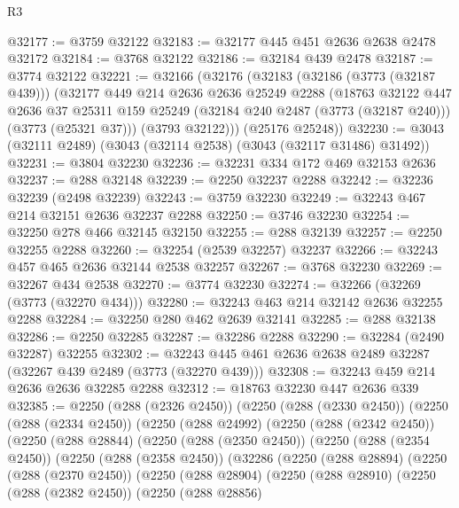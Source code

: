 \begin{lexlean}{R3}
\begin{coremodule}
@32177 := @3759 @32122
@32183 := @32177 @445 @451 @2636 @2638 @2478 @32172
@32184 := @3768 @32122
@32186 := @32184 @439 @2478
@32187 := @3774 @32122
@32221 := @32166
    (@32176
      (@32183
        (@32186 (@3773 (@32187 @439)))
        (@32177
          @449
          @214
          @2636
          @2636
          @25249
          @2288
          (@18763
            @32122
            @447
            @2636
            @37
            @25311
            @159
            @25249
            (@32184 @240 @2487 (@3773 (@32187 @240)))
            (@3773 (@25321 @37)))
          (@3793 @32122)))
      (@25176 @25248))
@32230 := @3043 (@32111 @2489) (@3043 (@32114 @2538) (@3043 (@32117 @31486) @31492))
@32231 := @3804 @32230
@32236 := @32231 @334 @172 @469 @32153 @2636
@32237 := @288 @32148
@32239 := @2250 @32237 @2288
@32242 := @32236 @32239 (@2498 @32239)
@32243 := @3759 @32230
@32249 := @32243 @467 @214 @32151 @2636 @32237 @2288
@32250 := @3746 @32230
@32254 := @32250 @278 @466 @32145 @32150
@32255 := @288 @32139
@32257 := @2250 @32255 @2288
@32260 := @32254 (@2539 @32257) @32237
@32266 := @32243 @457 @465 @2636 @32144 @2538 @32257
@32267 := @3768 @32230
@32269 := @32267 @434 @2538
@32270 := @3774 @32230
@32274 := @32266 (@32269 (@3773 (@32270 @434)))
@32280 := @32243 @463 @214 @32142 @2636 @32255 @2288
@32284 := @32250 @280 @462 @2639 @32141
@32285 := @288 @32138
@32286 := @2250 @32285
@32287 := @32286 @2288
@32290 := @32284 (@2490 @32287) @32255
@32302 := @32243 @445 @461 @2636 @2638 @2489 @32287 (@32267 @439 @2489 (@3773 (@32270 @439)))
@32308 := @32243 @459 @214 @2636 @2636 @32285 @2288
@32312 := @18763 @32230 @447 @2636 @339
@32385 := @2250
    (@288 (@2326 @2450))
    (@2250
      (@288 (@2330 @2450))
      (@2250
        (@288 (@2334 @2450))
        (@2250
          (@288 @24992)
          (@2250
            (@288 (@2342 @2450))
            (@2250
              (@288 @28844)
              (@2250
                (@288 (@2350 @2450))
                (@2250
                  (@288 (@2354 @2450))
                  (@2250
                    (@288 (@2358 @2450))
                    (@32286
                      (@2250
                        (@288 @28894)
                        (@2250
                          (@288 (@2370 @2450))
                          (@2250
                            (@288 @28904)
                            (@2250
                              (@288 @28910)
                              (@2250
                                (@288 (@2382 @2450))
                                (@2250
                                  (@288 @28856)

\end{coremodule}
\end{lexlean}
